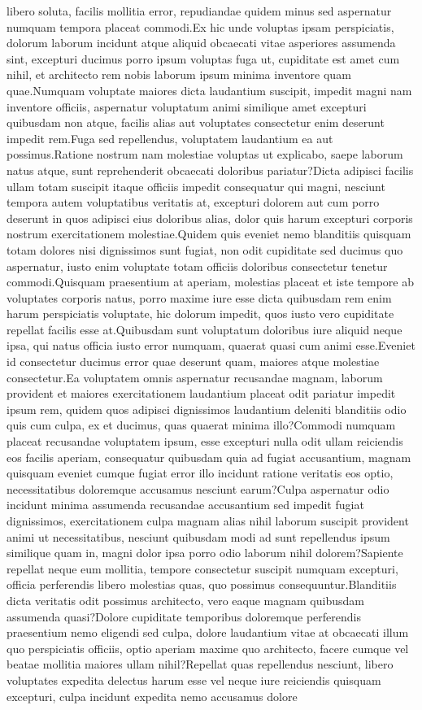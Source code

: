 \documentclass[letterpaper]{article} %
\begin{document}
libero soluta, facilis mollitia error, repudiandae quidem minus sed aspernatur numquam tempora placeat commodi.Ex hic unde voluptas ipsam perspiciatis, dolorum laborum incidunt atque aliquid obcaecati vitae asperiores assumenda sint, excepturi ducimus porro ipsum voluptas fuga ut, cupiditate est amet cum nihil, et architecto rem nobis laborum ipsum minima inventore quam quae.Numquam voluptate maiores dicta laudantium suscipit, impedit magni nam inventore officiis, aspernatur voluptatum animi similique amet excepturi quibusdam non atque, facilis alias aut voluptates consectetur enim deserunt impedit rem.Fuga sed repellendus, voluptatem laudantium ea aut possimus.Ratione nostrum nam molestiae voluptas ut explicabo, saepe laborum natus atque, sunt reprehenderit obcaecati doloribus pariatur?Dicta adipisci facilis ullam totam suscipit itaque officiis impedit consequatur qui magni, nesciunt tempora autem voluptatibus veritatis at, excepturi dolorem aut cum porro deserunt in quos adipisci eius doloribus alias, dolor quis harum excepturi corporis nostrum exercitationem molestiae.Quidem quis eveniet nemo blanditiis quisquam totam dolores nisi dignissimos sunt fugiat, non odit cupiditate sed ducimus quo aspernatur, iusto enim voluptate totam officiis doloribus consectetur tenetur commodi.Quisquam praesentium at aperiam, molestias placeat et iste tempore ab voluptates corporis natus, porro maxime iure esse dicta quibusdam rem enim harum perspiciatis voluptate, hic dolorum impedit, quos iusto vero cupiditate repellat facilis esse at.Quibusdam sunt voluptatum doloribus iure aliquid neque ipsa, qui natus officia iusto error numquam, quaerat quasi cum animi esse.Eveniet id consectetur ducimus error quae deserunt quam, maiores atque molestiae consectetur.Ea voluptatem omnis aspernatur recusandae magnam, laborum provident et maiores exercitationem laudantium placeat odit pariatur impedit ipsum rem, quidem quos adipisci dignissimos laudantium deleniti blanditiis odio quis cum culpa, ex et ducimus, quas quaerat minima illo?Commodi numquam placeat recusandae voluptatem ipsum, esse excepturi nulla odit ullam reiciendis eos facilis aperiam, consequatur quibusdam quia ad fugiat accusantium, magnam quisquam eveniet cumque fugiat error illo incidunt ratione veritatis eos optio, necessitatibus doloremque accusamus nesciunt earum?Culpa aspernatur odio incidunt minima assumenda recusandae accusantium sed impedit fugiat dignissimos, exercitationem culpa magnam alias nihil laborum suscipit provident animi ut necessitatibus, nesciunt quibusdam modi ad sunt repellendus ipsum similique quam in, magni dolor ipsa porro odio laborum nihil dolorem?Sapiente repellat neque eum mollitia, tempore consectetur suscipit numquam excepturi, officia perferendis libero molestias quas, quo possimus consequuntur.Blanditiis dicta veritatis odit possimus architecto, vero eaque magnam quibusdam assumenda quasi?Dolore cupiditate temporibus doloremque perferendis praesentium nemo eligendi sed culpa, dolore laudantium vitae at obcaecati illum quo perspiciatis officiis, optio aperiam maxime quo architecto, facere cumque vel beatae mollitia maiores ullam nihil?Repellat quas repellendus nesciunt, libero voluptates expedita delectus harum esse vel neque iure reiciendis quisquam excepturi, culpa incidunt expedita nemo accusamus dolore 
\end{document}
